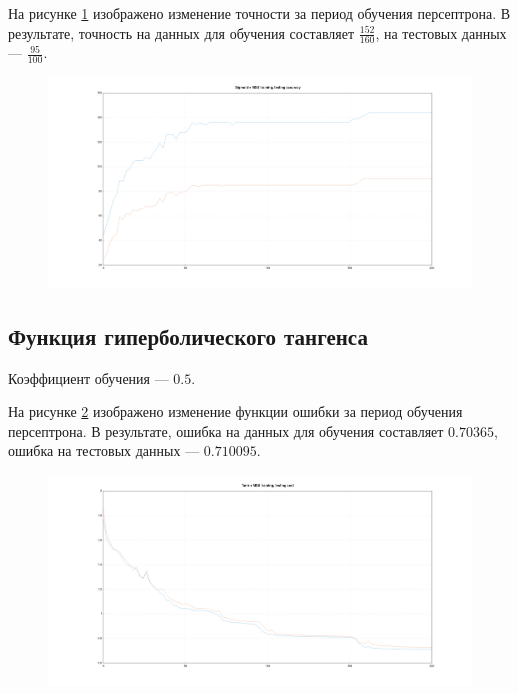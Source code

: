 \documentclass[a4paper, 14pt]{extarticle}
\begin{document}
На рисунке \ref{fig:sigmoid_mse_accuracy} изображено изменение точности за период обучения персептрона.
В результате, точность на данных для обучения составляет $\frac{152}{160}$, на тестовых данных --- $\frac{95}{100}$.

\begin{figure}[!htb]
  \centering\includegraphics[width=\textwidth]{images/sigmoid_mse_accuracy.png}
  \caption{}
  \label{fig:sigmoid_mse_accuracy}
\end{figure}

\subsection{Функция гиперболического тангенса}

Коэффициент обучения --- $0.5$.

На рисунке \ref{fig:tanh_mse_cost} изображено изменение функции ошибки за период обучения персептрона.
В результате, ошибка на данных для обучения составляет $0.70365$, ошибка на тестовых данных --- $0.710095$.

\begin{figure}[!htb]
  \centering\includegraphics[width=\textwidth]{images/tanh_mse_cost.png}
  \caption{}
  \label{fig:tanh_mse_cost}
\end{figure}
\end{document}
